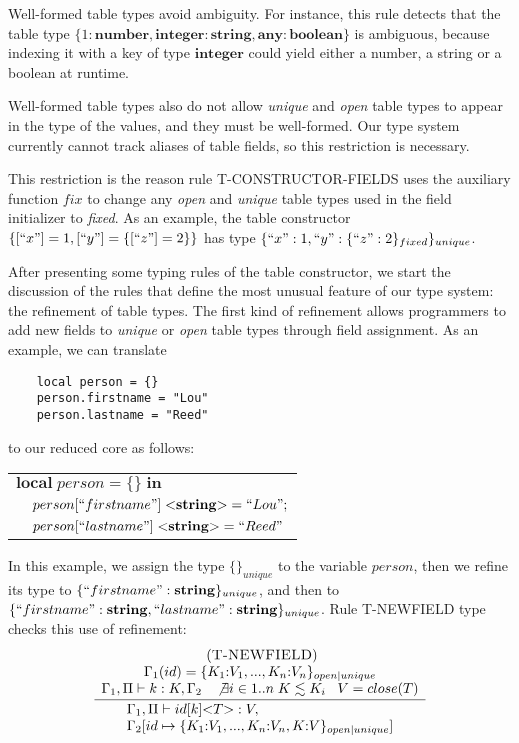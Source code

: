 \documentclass[preprint]{sigplanconf}
\newcommand{\Any}{\mathbf{any}}
\newcommand{\Boolean}{\mathbf{boolean}}
\newcommand{\Integer}{\mathbf{integer}}
\newcommand{\Number}{\mathbf{number}}
\newcommand{\String}{\mathbf{string}}
\newcommand{\mylabel}[1]{\; (\textsc{#1})}
\newcommand{\env}{\Gamma}
\newcommand{\penv}{\Pi}
\begin{document}
Well-formed table types avoid ambiguity.
For instance, this rule detects that the table type
$\{1:\Number, \Integer:\String, \Any:\Boolean\}$ is ambiguous,
because indexing it with a key of type $\Integer$ could
yield either a number, a string or a boolean at runtime.

Well-formed table types also do not allow \emph{unique} and
\emph{open} table types to appear in the type of the values,
and they must be well-formed. Our type system currently cannot
track aliases of table fields, so this restriction is
necessary. 

This restriction is the reason rule {\sc T-CONSTRUCTOR-FIELDS}
uses the auxiliary function $fix$ to change any {\em open}
and {\em unique} table types used in the field initializer
to {\em fixed}. As an example, the table constructor $\{[``x"] = 1, [``y"] = \{[``z"] = 2\}\}$
has type $\{``x":1, ``y":\{``z":2\}_{fixed}\}_{unique}$.

After presenting some typing rules of the table constructor,
we start the discussion of the rules that define the most
unusual feature of our type system: the refinement of table types.
The first kind of refinement allows programmers to add new
fields to \emph{unique} or \emph{open} table types through
field assignment.
As an example, we can translate
\begin{verbatim}
    local person = {}
    person.firstname = "Lou"
    person.lastname = "Reed"
\end{verbatim}
to our reduced core as follows:
\begin{center}
\begin{tabular}{ll}
\multicolumn{2}{l}{$\mathbf{local} \; person = \{\} \; \mathbf{in}$}\\
& \multicolumn{1}{l}{$person[``firstname"] \; {<}\String{>} = ``Lou";$}\\
& \multicolumn{1}{l}{$person[``lastname"] \; {<}\String{>} = ``Reed"$}
\end{tabular}
\end{center}

In this example, we assign the type $\{\}_{unique}$ to the variable
$person$, then we refine its type to $\{``firstname":\String\}_{unique}$,
and then to $\{``firstname":\String, ``lastname":\String\}_{unique}$.
Rule \textsc{T-NEWFIELD} type checks this use of refinement:
\[
\begin{array}{c}
\mylabel{T-NEWFIELD}\\
\dfrac{\begin{array}{c}
       \env_{1}(id) = \{ K_{1}{:}V_{1}, ..., K_{n}{:}V_{n} \}_{open|unique}\\
       \env_{1}, \penv \vdash k:K, \env_{2} \;\;\;
       \not \exists i \in 1..n \; K \lesssim K_{i} \;\;\;
       V = close(T)
       \end{array}}
      {\begin{array}{l}
       \env_{1}, \penv \vdash id[k] {<}T{>}:V, \\
       \env_{2}[id \mapsto \{ K_{1}{:}V_{1}, ..., K_{n}{:}V_{n}, K{:}V\}_{open|unique}]
       \end{array}}
\end{array}
\]
\end{document}
